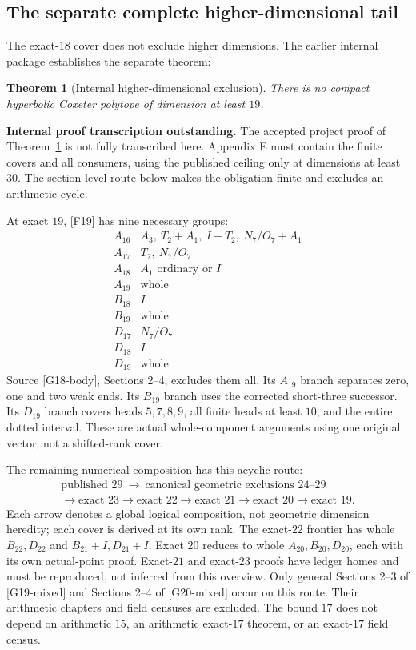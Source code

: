 \documentclass[11pt]{article}
\newtheorem{theorem}{Theorem}[section]
\theoremstyle{definition}
\theoremstyle{remark}
\newcommand{\src}[1]{\textnormal{\textsf{[#1]}}}
\newcommand{\pending}[1]{\par\smallskip\noindent
  {\color{red!65!black}\textbf{Internal proof transcription outstanding.} #1}\par\smallskip}
\begin{document}
\subsection{The separate complete higher-dimensional tail}
\label{subsec:higher}
The exact-\(18\) cover does not exclude higher dimensions.
The earlier internal package establishes the separate theorem:
\begin{theorem}[Internal higher-dimensional exclusion]
\label{thm:tail}
There is no compact hyperbolic Coxeter polytope of dimension at least \(19\).
\end{theorem}
\pending{The accepted project proof of Theorem~\ref{thm:tail} is not
fully transcribed here. Appendix E must contain the finite covers
and all consumers, using the published ceiling only at dimensions
at least \(30\). The section-level route below makes the obligation
finite and excludes an arithmetic cycle.}
At exact \(19\), \src{F19} has nine necessary groups:
\[
\begin{array}{c|l}
A_{16}&A_3,\ T_2+A_1,\ I+T_2,\ N_7/O_7+A_1\\
A_{17}&T_2,\ N_7/O_7\\
A_{18}&A_1\text{ ordinary or }I\\
A_{19}&\text{whole}\\ B_{18}&I\\ B_{19}&\text{whole}\\
D_{17}&N_7/O_7\\ D_{18}&I\\ D_{19}&\text{whole}.
\end{array}
\]
Source \src{G18-body}, Sections 2--4, excludes them all.
Its \(A_{19}\) branch separates zero, one and two weak ends.
Its \(B_{19}\) branch uses the corrected short-three successor.
Its \(D_{19}\) branch covers heads \(5,7,8,9\), all finite
heads at least \(10\), and the entire dotted interval.
These are actual whole-component arguments using one original
vector, not a shifted-rank cover.

The remaining numerical composition has this acyclic route:
\[
\begin{gathered}
\text{published }29\ \longrightarrow\
\text{canonical geometric exclusions }24\text{--}29\\
\longrightarrow\text{exact }23\longrightarrow\text{exact }22
\longrightarrow\text{exact }21\longrightarrow\text{exact }20
\longrightarrow\text{exact }19.
\end{gathered}
\]
Each arrow denotes a global logical composition, not geometric
dimension heredity; each cover is derived at its own rank.
The exact-\(22\) frontier has whole \(B_{22},D_{22}\) and
\(B_{21}+I,D_{21}+I\). Exact \(20\) reduces to whole
\(A_{20},B_{20},D_{20}\), each with its own actual-point proof.
Exact-\(21\) and exact-\(23\) proofs have ledger homes and
must be reproduced, not inferred from this overview.
Only general Sections 2--3 of \src{G19-mixed} and Sections
2--4 of \src{G20-mixed} occur on this route.
Their arithmetic chapters and field censuses are excluded.
The bound \(17\) does not depend on arithmetic \(15\), an
arithmetic exact-\(17\) theorem, or an exact-\(17\) field census.
\end{document}
